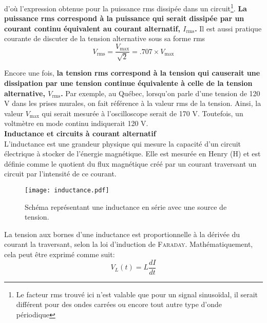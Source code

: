 \documentclass[titlepage,oneside,a4paper,11pt]{book} %
\begin{document}
d'où l'expression obtenue pour la puissance rms dissipée dans un circuit\footnote{Le facteur rms trouvé ici n'est valable que pour un signal sinusoïdal, il serait différent pour des ondes carrées ou encore tout autre type d'onde périodique}. \textbf{La puissance rms correspond à la puissance qui serait dissipée par un courant continu équivalent au courant alternatif, $I_{\mathrm{rms}}$.} Il est aussi pratique courante de discuter de la tension alternative sous sa forme rms
\begin{equation*}
V_{\mathrm{rms}} = \frac{V_{\mathrm{max}}}{\sqrt{2}} = .707 \times V_{\mathrm{max}}    
\end{equation*}

Encore une fois, \textbf{la tension rms correspond à la tension qui causerait une dissipation par une tension continue équivalente à celle de la tension alternative, $V_{\mathrm{rms}}$.} Par exemple, au Québec, lorsqu'on parle d'une tension de 120 V dans les prises murales, on fait référence à la valeur rms de la tension. Ainsi, la valeur $V_{\mathrm{max}}$ qui serait mesurée à l'oscilloscope serait de 170 V. Toutefois, un voltmètre en mode continu indiquerait 120 V.\\

{\Large \textbf{Inductance et circuits à courant alternatif}}\\

L’inductance est une grandeur physique qui mesure la capacité d’un circuit électrique à stocker de l’énergie magnétique. Elle est mesurée en Henry (H) et est définie comme le quotient du flux magnétique créé par un courant traversant un circuit par l’intensité de ce courant.\\

\begin{wrapfigure}{r}{0.5\textwidth}
  \begin{center}
    \texttt{[image: inductance.pdf]}
    \caption{Schéma représentant une inductance en série avec une source de tension.}
    \label{fig:L_circuit}
  \end{center}
\end{wrapfigure}

La tension aux bornes d’une inductance est proportionnelle à la dérivée du courant la traversant, selon la loi d’induction de \textsc{Faraday}. Mathématiquement, cela peut être exprimé comme suit:
\begin{equation*}
    V_L(t)=L\frac{dI}{dt}
\end{equation*}
\end{document}
